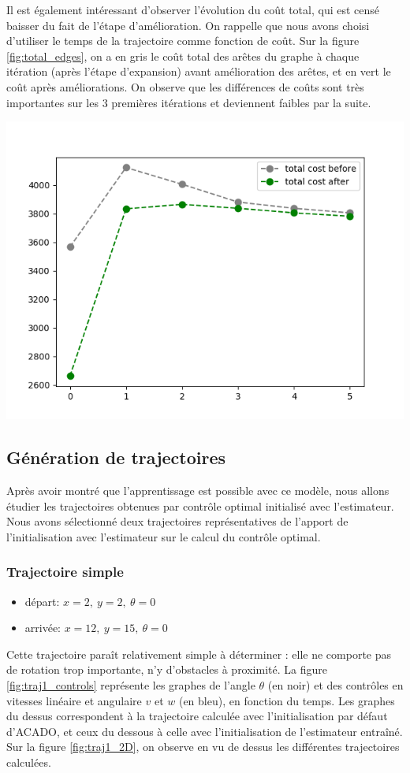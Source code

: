 \documentclass[a4paper,12pt]{report}
\newcommand{\itemo}{\item[\textsf{o}]}
\begin{document}
Il est également intéressant d'observer l'évolution du coût total, qui est censé baisser du fait de l'étape d'amélioration. On rappelle que nous avons choisi d'utiliser le temps de la trajectoire comme fonction de coût. Sur la figure \ref{fig:total_edges}, on a en gris le coût total des arêtes du graphe à chaque itération (après l'étape d'expansion) avant amélioration des arêtes, et en vert le coût après améliorations. On observe que les différences de coûts sont très importantes sur les 3 premières itérations et deviennent faibles par la suite.

\vspace{0.5cm}

\begin{center}
	\includegraphics[width=0.48\linewidth]{images/total_edges_cost_30nodes_6iterations.png}
	\label{fig:total_edges}
\end{center}


\subsection{Génération de trajectoires}
Après avoir montré que l'apprentissage est possible avec ce modèle, nous allons étudier les trajectoires obtenues par contrôle optimal initialisé avec l'estimateur. Nous avons sélectionné deux trajectoires représentatives de l'apport de l'initialisation avec l'estimateur sur le calcul du contrôle optimal.

\subsubsection{Trajectoire simple}
\begin{itemize}
	\itemo départ: $x=2,\ y=2,\ \theta=0$
	\itemo arrivée: $x=12,\ y=15,\ \theta=0$
\end{itemize}

Cette trajectoire paraît relativement simple à déterminer : elle ne comporte pas de rotation trop importante, n'y d'obstacles à proximité. La figure \ref{fig:traj1_controls} représente les graphes de l'angle $\theta$ (en noir) et des contrôles en vitesses linéaire et angulaire $v$ et $w$ (en bleu), en fonction du temps. Les graphes du dessus correspondent à la trajectoire calculée avec l'initialisation par défaut d'ACADO, et ceux du dessous à celle avec l'initialisation de l'estimateur entraîné. Sur la figure \ref{fig:traj1_2D}, on observe en vu de dessus les différentes trajectoires calculées.
\end{document}
